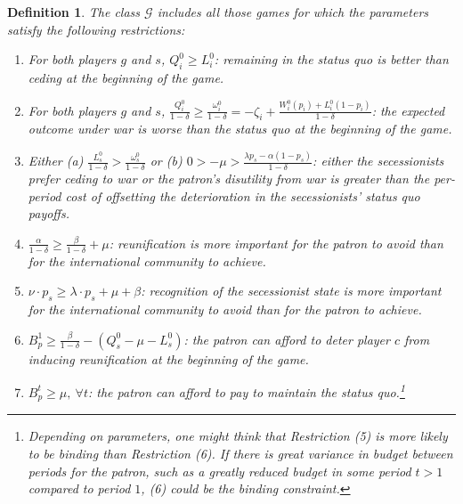 \documentclass[11pt,letterpaper, notitlepage]{article}
\newtheorem{definition}{Definition}
\newcommand{\de}{\delta}
\begin{document}
\begin{definition}
\emph{The class $\mathcal{G}$ includes all those games for which the parameters satisfy the following restrictions:}

\begin{enumerate}
\item \textit{For both players $g$ and $s$, $Q_i^0 \geq L_i^0$: remaining in the status quo is better than ceding at the beginning of the game.}\label{res:1}

\item \textit{For both players $g$ and $s$, $\frac {Q_i^0}{1-\delta} \geq \frac {\omega_i^0}{1-\delta} = -\zeta_i+\frac{W_i^0(p_i) + L_i^0(1-p_i)}{1-\delta}$: the expected outcome under war is worse than the status quo at the beginning of the game.}\label{res:2}

\item \textit{Either (a) $\frac{L_s^0}{1-\delta}  > \frac{\omega_s^0}{1-\delta}$ or (b) $0 > -\mu > \frac{\lambda p_s - \alpha (1-p_s)}{1-\de}$: either the secessionists prefer ceding to war or the patron's disutility from war is greater than the per-period cost of offsetting the deterioration in the secessionists' status quo payoffs.}\label{res:new}

\item \textit{$\frac{\alpha}{1-\de} \geq \frac{\beta}{1-\de} + \mu$: reunification is more important for the patron to avoid than for the international community to achieve.}\label{res:3}

\item  \textit{$\nu\cdot p_s \geq \lambda \cdot p_s + \mu + \beta$: recognition of the secessionist state is more important for the international community to avoid than for the patron to achieve.}\label{res:4}

\item  \textit{$B_p^1 \geq\frac{\beta}{1-\delta} - \left(Q_s^0 -\mu - L_s^0 \right)$: the patron can afford to deter player $c$ from inducing reunification at the beginning of the game.}\label{res:5}

\item \textit{$B_p^t \geq \mu, \ \forall t$: the patron can afford to pay to maintain the status quo.}\footnote{Depending on parameters, one might think that Restriction (5) is more likely to be binding than Restriction (6). If there is great variance in budget between periods for the patron, such as a greatly reduced budget in some period $t> 1$ compared to period $1$, (6) could be the binding constraint.}\label{res:6}

\end{enumerate}
\end{definition}
\end{document}
